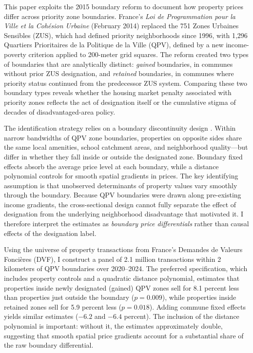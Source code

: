 \documentclass[12pt]{article}
\begin{document}
This paper exploits the 2015 boundary reform to document how property prices differ across priority zone boundaries. France's \textit{Loi de Programmation pour la Ville et la Coh\'{e}sion Urbaine} (February 2014) replaced the 751 Zones Urbaines Sensibles (ZUS), which had defined priority neighborhoods since 1996, with 1,296 Quartiers Prioritaires de la Politique de la Ville (QPV), defined by a new income-poverty criterion applied to 200-meter grid squares. The reform created two types of boundaries that are analytically distinct: \textit{gained} boundaries, in communes without prior ZUS designation, and \textit{retained} boundaries, in communes where priority status continued from the predecessor ZUS system. Comparing these two boundary types reveals whether the housing market penalty associated with priority zones reflects the act of designation itself or the cumulative stigma of decades of disadvantaged-area policy.

The identification strategy relies on a boundary discontinuity design \citep{black1999better, bayer2007unified}. Within narrow bandwidths of QPV zone boundaries, properties on opposite sides share the same local amenities, school catchment areas, and neighborhood quality---but differ in whether they fall inside or outside the designated zone. Boundary fixed effects absorb the average price level at each boundary, while a distance polynomial controls for smooth spatial gradients in prices. The key identifying assumption is that unobserved determinants of property values vary smoothly through the boundary. Because QPV boundaries were drawn along pre-existing income gradients, the cross-sectional design cannot fully separate the effect of designation from the underlying neighborhood disadvantage that motivated it. I therefore interpret the estimates as \textit{boundary price differentials} rather than causal effects of the designation label.

Using the universe of property transactions from France's Demandes de Valeurs Fonci\`{e}res (DVF), I construct a panel of 2.1 million transactions within 2 kilometers of QPV boundaries over 2020--2024. The preferred specification, which includes property controls and a quadratic distance polynomial, estimates that properties inside newly designated (gained) QPV zones sell for 8.1 percent less than properties just outside the boundary ($p = 0.009$), while properties inside retained zones sell for 5.9 percent less ($p = 0.018$). Adding commune fixed effects yields similar estimates ($-6.2$ and $-6.4$ percent). The inclusion of the distance polynomial is important: without it, the estimates approximately double, suggesting that smooth spatial price gradients account for a substantial share of the raw boundary differential.
\end{document}
